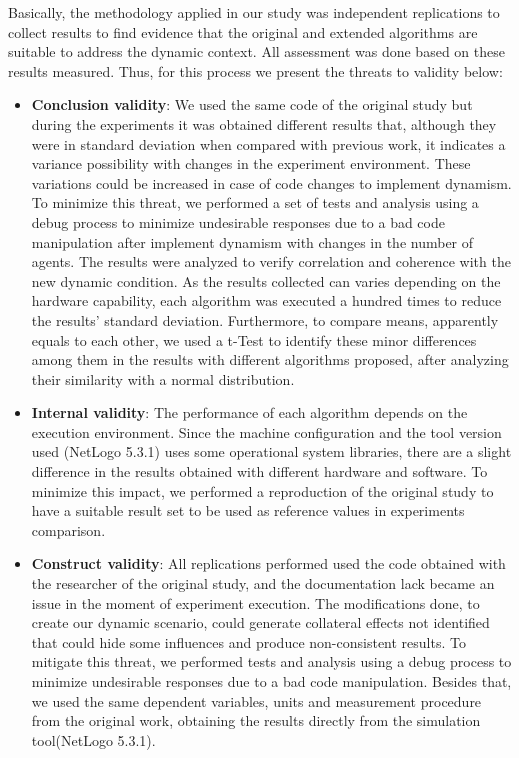 
Basically, the methodology applied in our study was independent replications to collect results to find evidence that the original and extended algorithms are suitable to address the dynamic context. All assessment was done based on these results measured. Thus, for this process we present the threats to validity below: 

\begin{itemize}
   \item \textbf{Conclusion validity}: We used the same code of the original study but during the experiments it was obtained different results that, although they were in standard deviation when compared with previous work, it indicates a variance possibility with changes in the experiment environment. These variations could be increased in case of code changes to implement dynamism. To minimize this threat, we performed a set of tests and analysis using a debug process to minimize undesirable responses due to a bad code manipulation after implement dynamism with changes in the number of agents. The results were analyzed to verify correlation and coherence with the new dynamic condition. As the results collected can varies depending on the hardware capability, each algorithm was executed a hundred times to reduce the results' standard deviation. Furthermore, to compare means, apparently equals to each other, we used a t-Test to identify these minor differences among them in the results with different algorithms proposed, after analyzing their similarity with a normal distribution.
   \item \textbf{Internal validity}: The performance of each algorithm depends on the execution environment. Since the machine configuration and the tool version used (NetLogo 5.3.1) uses some operational system libraries, there are a slight difference in the results obtained with different hardware and software. To minimize this impact, we performed a reproduction of the original study \cite{MAS07} to have a suitable result set to be used as reference values in experiments comparison.
   \item \textbf{Construct validity}: All replications performed used the code obtained with the researcher of the original study, and the documentation lack became an issue in the moment of experiment execution. The modifications done, to create our dynamic scenario, could generate collateral effects not identified that could hide some influences and produce non-consistent results. To mitigate this threat, we performed tests and analysis using a debug process to minimize undesirable responses due to a bad code manipulation. Besides that, we used the same dependent variables, units and measurement procedure from the original work, obtaining the results directly from the simulation tool(NetLogo 5.3.1).

\end{itemize}

